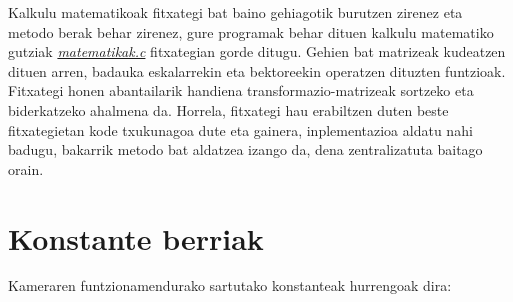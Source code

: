 \documentclass[12pt]{article}
\newcommand{\fitxategi}[1] {\underline{\textit{#1}}}
\begin{document}
Kalkulu matematikoak fitxategi bat baino gehiagotik burutzen zirenez eta metodo berak behar zirenez, gure programak behar dituen kalkulu matematiko gutziak \fitxategi{matematikak.c} fitxategian gorde ditugu. Gehien bat matrizeak kudeatzen dituen arren, badauka eskalarrekin eta bektoreekin operatzen dituzten funtzioak.\\

Fitxategi honen abantailarik handiena transformazio-matrizeak sortzeko eta biderkatzeko ahalmena da. Horrela, fitxategi hau erabiltzen duten beste fitxategietan kode txukunagoa dute eta gainera, inplementazioa aldatu nahi badugu, bakarrik metodo bat aldatzea izango da, dena zentralizatuta baitago orain.

\pagebreak

\section{Konstante berriak}\label{constants}

Kameraren funtzionamendurako sartutako konstanteak hurrengoak dira:
\end{document}
